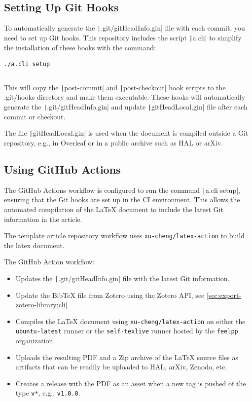 \documentclass[a4paper]{article}
\begin{document}
\subsection{Setting Up Git Hooks}

To automatically generate the \texttt|.git/gitHeadInfo.gin| file with each commit, you need to set up Git hooks.
This repository includes the script \texttt|a.cli| to simplify the installation of these hooks with the command:

\begin{verbatim}
./a.cli setup
\end{verbatim}

\inputminted[linenos,autogobble,bgcolor=background,fontsize=\small,firstline=6,lastline=23]{sh}{a.cli}

This will copy the \texttt|post-commit| and \texttt|post-checkout| hook scripts to the .git/hooks directory and make them executable.
These hooks will automatically generate the \texttt|.git/gitHeadInfo.gin| and update \texttt|gitHeadLocal.gin| file after each commit or checkout.

The file \texttt|gitHeadLocal.gin| is used when the document is compiled outside a Git repository, e.g., in Overleaf or in a public archive such as HAL or arXiv.


\subsection{Using GitHub Actions}

The GitHub Actions workflow is configured to run the command \texttt|a.cli setup|, ensuring that the Git hooks are set up in the CI environment.
This allows the automated compilation of the \LaTeX{} document to include the latest Git information in the article.

The template article repository workflow uses \citep{cheng_xu_xu-chenglatex-action_2024} \texttt{xu-cheng/latex-action} to build the latex document.

The GitHub Action workflow:
\begin{itemize}
    \item Updates the \texttt|.git/gitHeadInfo.gin| file with the latest Git information.
    \item Update the BibTeX file from Zotero using the Zotero API, see \cref{sec:export-zotero-library:cli}
    \item Compiles the \LaTeX{} document using \texttt{xu-cheng/latex-action} on either the \texttt{ubuntu-latest} runner or the \texttt{self-texlive} runner hosted by the \texttt{feelpp} organization.
    \item Uploads the resulting PDF and a Zip archive of the \LaTeX{} source files as artifacts that can be readily be uploaded to HAL, arXiv, Zenodo, etc.
    \item Creates a release with the PDF as an asset when a new tag is pushed of the type \texttt{v*}, e.g., \texttt{v1.0.0}.
\end{itemize}
\end{document}
